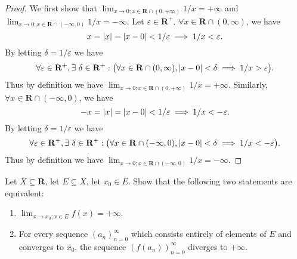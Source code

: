 \begin{proof}
    We first show that \(\lim_{x \to 0 ; x \in \mathbf{R} \cap (0, +\infty)} 1 / x = +\infty\) and \(\lim_{x \to 0 ; x \in \mathbf{R} \cap (-\infty, 0)} 1 / x = -\infty\).
    Let \(\varepsilon \in \mathbf{R}^+\).
    \(\forall x \in \mathbf{R} \cap (0, \infty)\), we have
    \[
        x = \abs*{x} = \abs*{x - 0} < 1 / \varepsilon \implies 1 / x < \varepsilon.
    \]
    By letting \(\delta = 1 / \varepsilon\) we have
    \[
        \forall \varepsilon \in \mathbf{R}^+, \exists\ \delta \in \mathbf{R}^+ : \big(\forall x \in \mathbf{R} \cap (0, \infty), \abs*{x - 0} < \delta \implies 1 / x > \varepsilon\big).
    \]
    Thus by definition we have \(\lim_{x \to 0 ; x \in \mathbf{R} \cap (0, +\infty)} 1 / x = +\infty\).
    Similarly, \(\forall x \in \mathbf{R} \cap (-\infty, 0)\), we have
    \[
        -x = \abs*{x} = \abs*{x - 0} < 1 / \varepsilon \implies 1 / x < -\varepsilon.
    \]
    By letting \(\delta = 1 / \varepsilon\) we have
    \[
        \forall \varepsilon \in \mathbf{R}^+, \exists\ \delta \in \mathbf{R}^+ : \big(\forall x \in \mathbf{R} \cap (-\infty, 0), \abs*{x - 0} < \delta \implies 1 / x < -\varepsilon\big).
    \]
    Thus by definition we have \(\lim_{x \to 0 ; x \in \mathbf{R} \cap (-\infty, 0)} 1 / x = -\infty\).
\end{proof}

\begin{additional corollary}\label{ac 9.5.3}
Let \(X \subseteq \mathbf{R}\), let \(E \subseteq X\), let \(x_0 \in \overline{E}\).
Show that the following two statements are equivalent:
\begin{enumerate}
    \item \(\lim_{x \to x_0 ; x \in E} f(x) = +\infty\).
    \item For every sequence \((a_n)_{n = 0}^\infty\) which consists entirely of elements of \(E\) and converges to \(x_0\), the sequence \((f(a_n))_{n = 0}^\infty\) diverges to \(+\infty\).
\end{enumerate}
\end{additional corollary}


